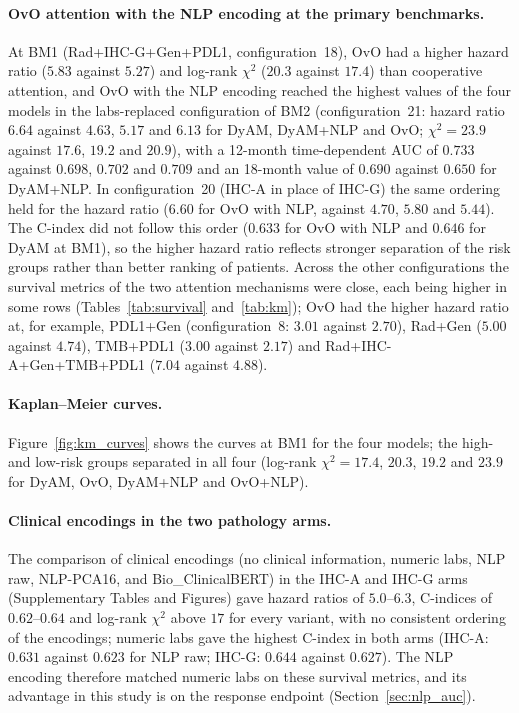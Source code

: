 \paragraph{OvO attention with the NLP encoding at the primary benchmarks.}
At BM1 (Rad+IHC-G+Gen+PDL1, configuration~18), OvO had a higher hazard ratio ($5.83$ against $5.27$) and log-rank $\chi^2$
($20.3$ against $17.4$) than cooperative attention, and OvO with the NLP encoding reached the highest values of the four models
in the labs-replaced configuration of BM2 (configuration~21: hazard ratio $6.64$ against $4.63$, $5.17$ and $6.13$ for DyAM, DyAM+NLP and OvO;
$\chi^2 = 23.9$ against $17.6$, $19.2$ and $20.9$), with a 12-month time-dependent AUC of $0.733$ against $0.698$, $0.702$ and $0.709$
and an 18-month value of $0.690$ against $0.650$ for DyAM+NLP.
In configuration~20 (IHC-A in place of IHC-G) the same ordering held for the hazard ratio ($6.60$ for OvO with NLP, against $4.70$, $5.80$ and $5.44$).
The C-index did not follow this order ($0.633$ for OvO with NLP and $0.646$ for DyAM at BM1), so the higher hazard ratio reflects stronger separation of
the risk groups rather than better ranking of patients.
Across the other configurations the survival metrics of the two attention mechanisms were close, each being higher in some rows
(Tables~\ref{tab:survival} and~\ref{tab:km}); OvO had the higher hazard ratio at, for example, PDL1+Gen (configuration~8: $3.01$ against $2.70$), Rad+Gen
($5.00$ against $4.74$), TMB+PDL1 ($3.00$ against $2.17$) and Rad+IHC-A+Gen+TMB+PDL1 ($7.04$ against $4.88$).

\paragraph{Kaplan--Meier curves.}
Figure~\ref{fig:km_curves} shows the curves at BM1 for the four models; the high- and low-risk groups separated in all four
(log-rank $\chi^2 = 17.4$, $20.3$, $19.2$ and $23.9$ for DyAM, OvO, DyAM+NLP and OvO+NLP).

\paragraph{Clinical encodings in the two pathology arms.}
The comparison of clinical encodings (no clinical information, numeric labs, NLP raw, NLP-PCA16, and Bio\_ClinicalBERT) in the IHC-A and IHC-G arms
(Supplementary Tables and Figures) gave hazard ratios of $5.0$--$6.3$, C-indices of $0.62$--$0.64$ and log-rank $\chi^2$ above $17$ for every variant,
with no consistent ordering of the encodings; numeric labs gave the highest C-index in both arms (IHC-A: $0.631$ against $0.623$ for NLP raw;
IHC-G: $0.644$ against $0.627$).
The NLP encoding therefore matched numeric labs on these survival metrics, and its advantage in this study is on the response endpoint (Section~\ref{sec:nlp_auc}).

